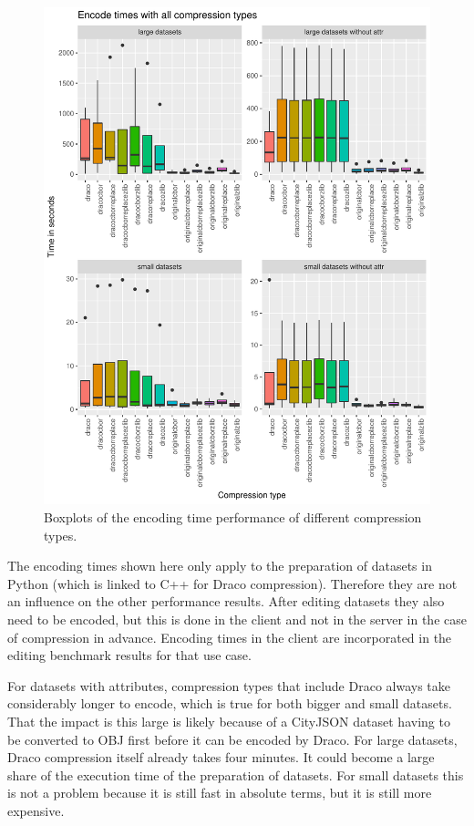 \begin{figure}[h!]
    \includegraphics[scale=0.88]{figs/benchmark/overview/encodingtimes.pdf}
    \caption{Boxplots of the encoding time performance of different compression types.}
    \label{fig:encodingperformance}
\end{figure}


The encoding times shown here only apply to the preparation of datasets in Python (which is linked to C++ for Draco compression).
Therefore they are not an influence on the other performance results.
After editing datasets they also need to be encoded, but this is done in the client and not in the server in the case of compression in advance.
Encoding times in the client are incorporated in the editing benchmark results for that use case.

For datasets with attributes, compression types that include Draco always take considerably longer to encode, which is true for both bigger and small datasets.
That the impact is this large is likely because of a CityJSON dataset having to be converted to OBJ first before it can be encoded by Draco.
For large datasets, Draco compression itself already takes four minutes.
It could become a large share of the execution time of the preparation of datasets.
For small datasets this is not a problem because it is still fast in absolute terms, but it is still more expensive.

